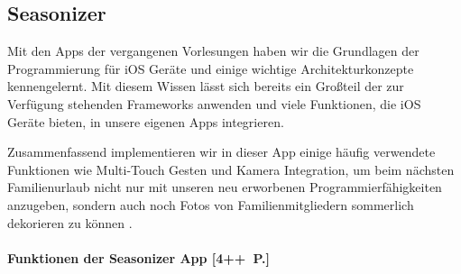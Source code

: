 \documentclass[parskip=half, final]{scrreprt}
\begin{document}
\begin{lecture}


\chapter{Seasonizer}

Mit den Apps der vergangenen Vorlesungen haben wir die Grundlagen der Programmierung für iOS Geräte und einige wichtige Architekturkonzepte kennengelernt. Mit diesem Wissen lässt sich bereits ein Großteil der zur Verfügung stehenden Frameworks anwenden und viele Funktionen, die iOS Geräte bieten, in unsere eigenen Apps integrieren.


Zusammenfassend implementieren wir in dieser App einige häufig verwendete Funktionen wie Multi-Touch Gesten und Kamera Integration, um beim nächsten Familienurlaub nicht nur mit unseren neu erworbenen Programmierfähigkeiten anzugeben, sondern auch noch Fotos von Familienmitgliedern sommerlich dekorieren zu können .


\subsubsection{Funktionen der Seasonizer App [4++~P.]}


\end{lecture}
\end{document}
